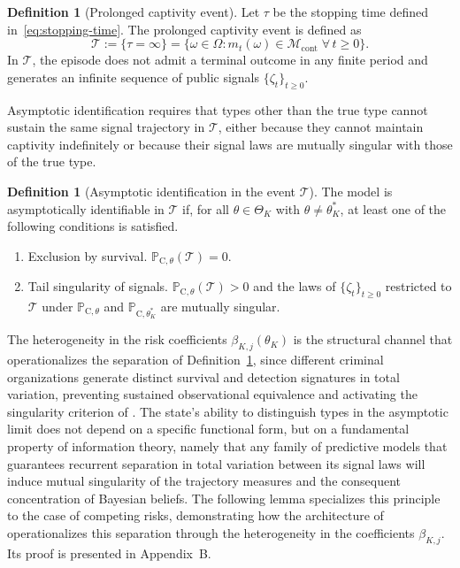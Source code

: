 \documentclass[pdflatex,sn-mathphys-ay]{sn-jnl}
\theoremstyle{plain}
\theoremstyle{definition}
\newtheorem{definition}[theorem]{Definition}
\newcommand{\ProbC}[1]{\mathbb{P}_{\mathrm{C},#1}}
\newcommand{\ThetaK}{\Theta_K}
\newcommand{\1}{\mathbf{1}}
\begin{document}
\begin{definition}[Prolonged captivity event]\label{def:event-T-long}
Let $\tau$ be the stopping time defined in~\eqref{eq:stopping-time}. The prolonged captivity event is defined as
\[
\mathcal{T}:=\{\tau=\infty\}=\bigl\{\omega\in\Omega:m_t(\omega)\in\mathcal{M}_{\mathrm{cont}}\;\forall\,t\ge 0\bigr\}.
\]
In $\mathcal{T}$, the episode does not admit a terminal outcome in any finite period and generates an infinite sequence of public signals $\{\zeta_t\}_{t\ge 0}$.
\end{definition}

Asymptotic identification requires that types other than the true type cannot sustain the same signal trajectory in $\mathcal{T}$, either because they cannot maintain captivity indefinitely or because their signal laws are mutually singular with those of the true type.

\begin{definition}[Asymptotic identification in the event $\mathcal{T}$]\label{def:asymptotic-id}
The model is asymptotically identifiable in $\mathcal{T}$ if, for all $\theta\in\ThetaK$ with $\theta\neq\theta_K^\ast$, at least one of the following conditions is satisfied.
\begin{enumerate}
  \item[\textup{(a)}] Exclusion by survival. $\ProbC{\theta}(\mathcal{T})=0$.
  \item[\textup{(b)}] Tail singularity of signals. $\ProbC{\theta}(\mathcal{T})>0$ and the laws of $\{\zeta_t\}_{t\ge 0}$ restricted to $\mathcal{T}$ under $\ProbC{\theta}$ and $\ProbC{\theta_K^\ast}$ are mutually singular.
\end{enumerate}
\end{definition}

The heterogeneity in the risk coefficients $\beta_{K,j}(\theta_K)$ is the structural channel that operationalizes the separation of Definition~\ref{def:asymptotic-id}, since different criminal organizations generate distinct survival and detection signatures in total variation, preventing sustained observational equivalence and activating the singularity criterion of \citet{Kakutani1948}. The state's ability to distinguish types in the asymptotic limit does not depend on a specific functional form, but on a fundamental property of information theory, namely that any family of predictive models that guarantees recurrent separation in total variation between its signal laws will induce mutual singularity of the trajectory measures and the consequent concentration of Bayesian beliefs. The following lemma specializes this principle to the case of competing risks, demonstrating how the architecture of \citet{Cox1972} operationalizes this separation through the heterogeneity in the coefficients $\beta_{K,j}$. Its proof is presented in Appendix~B.
\end{document}
